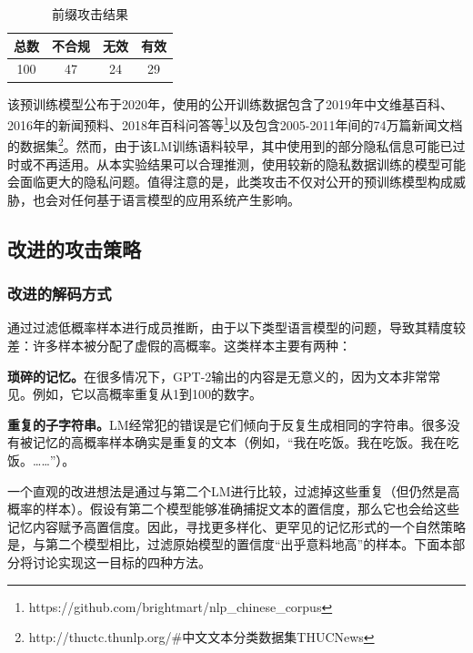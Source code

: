 \begin{table}[]
	\centering
	\caption{前缀攻击结果}
	\begin{tabular}{|c|c|c|c|}
		\hline
		总数&不合规&无效&有效   \\ \hline
		100&47&24&29    \\ \hline
	\end{tabular}
	\label{Prefix_Attack_Table}
\end{table}


该预训练模型公布于2020年，使用的公开训练数据包含了2019年中文维基百科、2016年的新闻预料、2018年百科问答等\footnote{https://github.com/brightmart/nlp\_chinese\_corpus}以及包含2005-2011年间的74万篇新闻文档的数据集\footnote{http://thuctc.thunlp.org/\#中文文本分类数据集THUCNews}。然而，由于该LM训练语料较早，其中使用到的部分隐私信息可能已过时或不再适用。从本实验结果可以合理推测，使用较新的隐私数据训练的模型可能会面临更大的隐私问题。值得注意的是，此类攻击不仅对公开的预训练模型构成威胁，也会对任何基于语言模型的应用系统产生影响。

\subsection{改进的攻击策略}

\subsubsection{改进的解码方式}

通过过滤低概率样本进行成员推断，由于以下类型语言模型的问题，导致其精度较差：许多样本被分配了虚假的高概率。这类样本主要有两种：

\textbf{琐碎的记忆。}在很多情况下，GPT-2输出的内容是无意义的，因为文本非常常见。例如，它以高概率重复从1到100的数字。

\textbf{重复的子字符串。}LM经常犯的错误是它们倾向于反复生成相同的字符串。很多没有被记忆的高概率样本确实是重复的文本（例如，“我在吃饭。我在吃饭。我在吃饭。……”）。

一个直观的改进想法是通过与第二个LM进行比较，过滤掉这些重复（但仍然是高概率的样本）。假设有第二个模型能够准确捕捉文本的置信度，那么它也会给这些记忆内容赋予高置信度。因此，寻找更多样化、更罕见的记忆形式的一个自然策略是，与第二个模型相比，过滤原始模型的置信度“出乎意料地高”的样本。下面本部分将讨论实现这一目标的四种方法。

